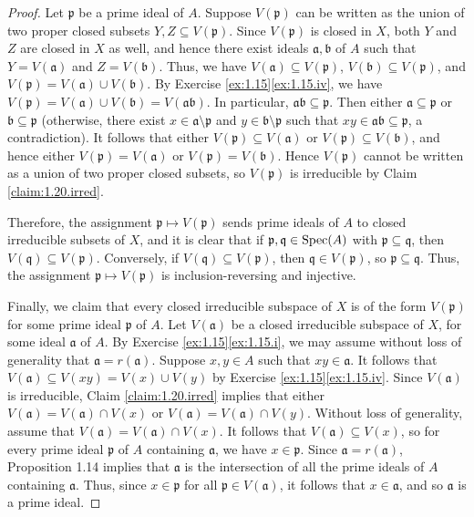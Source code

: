 \begin{proof}
Let $\mathfrak p$ be a prime ideal of $A$.
Suppose $V(\mathfrak p)$ can be written as the union of two proper closed subsets $Y,Z\subseteq V(\mathfrak p)$.
Since $V(\mathfrak p)$ is closed in $X$, both $Y$ and $Z$ are closed in $X$ as well, and hence there exist ideals $\mathfrak a,\mathfrak b$ of $A$ such that $Y=V(\mathfrak a)$ and $Z = V(\mathfrak b)$.
Thus, we have $V(\mathfrak a) \subseteq V(\mathfrak p)$, $V(\mathfrak b) \subseteq V(\mathfrak p)$, and $V(\mathfrak p) = V(\mathfrak a) \cup V(\mathfrak b)$.
By Exercise \ref{ex:1.15}\ref{ex:1.15.iv}, we have $V(\mathfrak p) = V(\mathfrak a) \cup V(\mathfrak b) = V(\mathfrak a \mathfrak b)$.
In particular, $\mathfrak a\mathfrak b \subseteq \mathfrak p$.
Then either $\mathfrak a \subseteq \mathfrak p$ or $\mathfrak b \subseteq \mathfrak p$ (otherwise, there exist $x\in \mathfrak a\setminus\mathfrak p$ and $y\in \mathfrak b\setminus \mathfrak p$ such that $x y \in \mathfrak a \mathfrak b \subseteq \mathfrak p$, a contradiction).
It follows that either $V(\mathfrak p)\subseteq V(\mathfrak a)$ or $V(\mathfrak p)\subseteq V(\mathfrak b)$, and hence either $V(\mathfrak p) = V(\mathfrak a)$ or $V(\mathfrak p) = V(\mathfrak b)$.
Hence $V(\mathfrak p)$ cannot be written as a union of two proper closed subsets, so $V(\mathfrak p)$ is irreducible by Claim \ref{claim:1.20.irred}.

Therefore, the assignment $\mathfrak p \mapsto V(\mathfrak p)$ sends prime ideals of $A$ to closed irreducible subsets of $X$, and it is clear that if $\mathfrak p,\mathfrak q\in \operatorname{Spec}(A)$ with $\mathfrak p \subseteq \mathfrak q$, then $V(\mathfrak q) \subseteq V(\mathfrak p)$.
Conversely, if $V(\mathfrak q) \subseteq V(\mathfrak p)$, then $\mathfrak q \in V(\mathfrak p)$, so $\mathfrak p \subseteq \mathfrak q$.
Thus, the assignment $\mathfrak p \mapsto V(\mathfrak p)$ is inclusion-reversing and injective.

Finally, we claim that every closed irreducible subspace of $X$ is of the form $V(\mathfrak p)$ for some prime ideal $\mathfrak p$ of $A$.
Let $V(\mathfrak a)$ be a closed irreducible subspace of $X$, for some ideal $\mathfrak a$ of $A$.
By Exercise \ref{ex:1.15}\ref{ex:1.15.i}, we may assume without loss of generality that $\mathfrak a = r(\mathfrak a)$.
Suppose $x, y \in A$ such that $x y\in \mathfrak a$.
It follows that $V(\mathfrak a) \subseteq V(x y) = V(x) \cup V(y)$ by Exercise \ref{ex:1.15}\ref{ex:1.15.iv}.
Since $V(\mathfrak a)$ is irreducible, Claim \ref{claim:1.20.irred} implies that either $V(\mathfrak a) = V(\mathfrak a)\cap V(x)$ or $V(\mathfrak a) = V(\mathfrak a)\cap V(y)$.
Without loss of generality, assume that $V(\mathfrak a) = V(\mathfrak a) \cap V(x)$.
It follows that $V(\mathfrak a) \subseteq V(x)$, so for every prime ideal $\mathfrak p$ of $A$ containing $\mathfrak a$, we have $x \in \mathfrak p$.
Since $\mathfrak a = r(\mathfrak a)$, Proposition 1.14 implies that $\mathfrak a$ is the intersection of all the prime ideals of $A$ containing $\mathfrak a$.
Thus, since $x\in\mathfrak p$ for all $\mathfrak p\in V(\mathfrak a)$, it follows that $x \in \mathfrak a$, and so $\mathfrak a$ is a prime ideal.
\end{proof}




